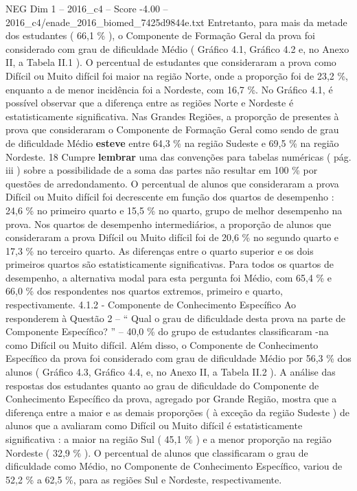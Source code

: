 \begin{textsample}{NEG Dim 1 – 2016\_c4 – Score -4.00 – 2016\_c4/enade\_2016\_biomed\_7425d9844e.txt}
Entretanto, para mais da metade dos estudantes ( 66,1 \% ), o Componente de Formação Geral da prova foi considerado com grau de dificuldade Médio ( Gráfico 4.1, Gráfico 4.2 e, no Anexo II, a Tabela II.1 ).
O percentual de estudantes que consideraram a prova como Difícil ou Muito difícil foi maior na região Norte, onde a proporção foi de 23,2 \%, enquanto a de menor incidência foi a Nordeste, com 16,7 \%.
No Gráfico 4.1, é possível observar que a diferença entre as regiões Norte e Nordeste é estatisticamente significativa.
Nas Grandes Regiões, a proporção de presentes à prova que consideraram o Componente de Formação Geral como sendo de grau de dificuldade Médio \textbf{esteve} entre 64,3 \% na região Sudeste e 69,5 \% na região Nordeste. 18 Cumpre \textbf{lembrar} uma das convenções para tabelas numéricas ( pág. iii ) sobre a possibilidade de a soma das partes não resultar em 100 \% por questões de arredondamento.
O percentual de alunos que consideraram a prova Difícil ou Muito difícil foi decrescente em função dos quartos de desempenho : 24,6 \% no primeiro quarto e 15,5 \% no quarto, grupo de melhor desempenho na prova.
Nos quartos de desempenho intermediários, a proporção de alunos que consideraram a prova Difícil ou Muito difícil foi de 20,6 \% no segundo quarto e 17,3 \% no terceiro quarto.
As diferenças entre o quarto superior e os dois primeiros quartos são estatisticamente significativas.
Para todos os quartos de desempenho, a alternativa modal para esta pergunta foi Médio, com 65,4 \% e 66,0 \% dos respondentes nos quartos extremos, primeiro e quarto, respectivamente. 4.1.2 - Componente de Conhecimento Específico Ao responderem à Questão 2 – “ Qual o grau de dificuldade desta prova na parte de Componente Específico? ” – 40,0 \% do grupo de estudantes classificaram -na como Difícil ou Muito difícil.
Além disso, o Componente de Conhecimento Específico da prova foi considerado com grau de dificuldade Médio por 56,3 \% dos alunos ( Gráfico 4.3, Gráfico 4.4, e, no Anexo II, a Tabela II.2 ).
A análise das respostas dos estudantes quanto ao grau de dificuldade do Componente de Conhecimento Específico da prova, agregado por Grande Região, mostra que a diferença entre a maior e as demais proporções ( à exceção da região Sudeste ) de alunos que a avaliaram como Difícil ou Muito difícil é estatisticamente significativa : a maior na região Sul ( 45,1 \% ) e a menor proporção na região Nordeste ( 32,9 \% ).
O percentual de alunos que classificaram o grau de dificuldade como Médio, no Componente de Conhecimento Específico, variou de 52,2 \% a 62,5 \%, para as regiões Sul e Nordeste, respectivamente.

\end{textsample}
